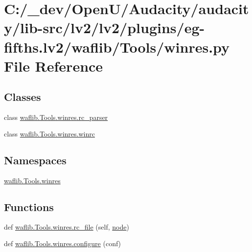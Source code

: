 \hypertarget{lv2_2plugins_2eg-fifths_8lv2_2waflib_2_tools_2winres_8py}{}\section{C\+:/\+\_\+dev/\+Open\+U/\+Audacity/audacity/lib-\/src/lv2/lv2/plugins/eg-\/fifths.lv2/waflib/\+Tools/winres.py File Reference}
\label{lv2_2plugins_2eg-fifths_8lv2_2waflib_2_tools_2winres_8py}
\subsection*{Classes}
\begin{DoxyCompactItemize}
\item 
class \hyperlink{classwaflib_1_1_tools_1_1winres_1_1rc__parser}{waflib.\+Tools.\+winres.\+rc\+\_\+parser}
\item 
class \hyperlink{classwaflib_1_1_tools_1_1winres_1_1winrc}{waflib.\+Tools.\+winres.\+winrc}
\end{DoxyCompactItemize}
\subsection*{Namespaces}
\begin{DoxyCompactItemize}
\item 
 \hyperlink{namespacewaflib_1_1_tools_1_1winres}{waflib.\+Tools.\+winres}
\end{DoxyCompactItemize}
\subsection*{Functions}
\begin{DoxyCompactItemize}
\item 
def \hyperlink{namespacewaflib_1_1_tools_1_1winres_ac3e0ca77b048ed70a3403f4bbda55f9e}{waflib.\+Tools.\+winres.\+rc\+\_\+file} (self, \hyperlink{structnode}{node})
\item 
def \hyperlink{namespacewaflib_1_1_tools_1_1winres_a61d49dde1a942da70092bb59fe817f18}{waflib.\+Tools.\+winres.\+configure} (conf)
\end{DoxyCompactItemize}

